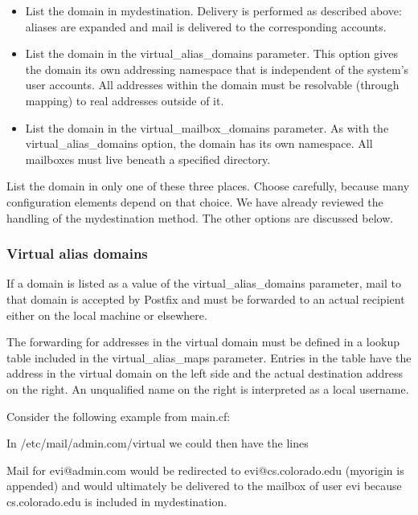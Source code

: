 \begin{itemize}
\tightlist
\item
  List the domain in {mydestination}. Delivery is performed as described
  above: aliases are expanded and mail is delivered to the corresponding
  accounts.
\item
  List the domain in the {virtual\_alias\_domains} parameter. This
  option gives the domain its own addressing namespace that is
  independent of the system's user accounts. All addresses within the
  domain must be resolvable (through mapping) to real addresses outside
  of it.
\item
  List the domain in the {virtual\_mailbox\_domains} parameter. As with
  the {virtual\_alias\_domains} option, the domain has its own
  namespace. All mailboxes must live beneath a specified directory.
\end{itemize}

List the domain in only one of these three places. Choose carefully,
because many configuration elements depend on that choice. We have
already reviewed the handling of the {mydestination} method. The other
options are discussed below.

\subsubsection[Virtual alias
domains]{\texorpdfstring{\protect\hypertarget{part0026_split_062.htmlux5cux23_idTextAnchor1185}{}{}Virtual
alias domains}{Virtual alias domains}}

If a domain is listed as a value of the {virtual\_alias\_domains}
parameter, mail to that domain is accepted by Postfix and must be
forwarded to an actual recipient either on the local machine or
elsewhere.

The forwarding for addresses in the virtual domain must be defined in a
lookup table included in the {virtual\_alias\_maps} parameter. Entries
in the table have the address in the virtual domain on the left side and
the actual destination address on the right. An unqualified name on the
right is interpreted as a local username.

Consider the following example from {main.cf}:


In {/etc/mail/admin.com/virtual} we could then have the lines


Mail for evi@admin.com would be redirected to evi@cs.colorado.edu
({myorigin} is appended) and would ultimately be delivered to the
mailbox of user evi because cs.colorado.edu is included in
{mydestination}.

